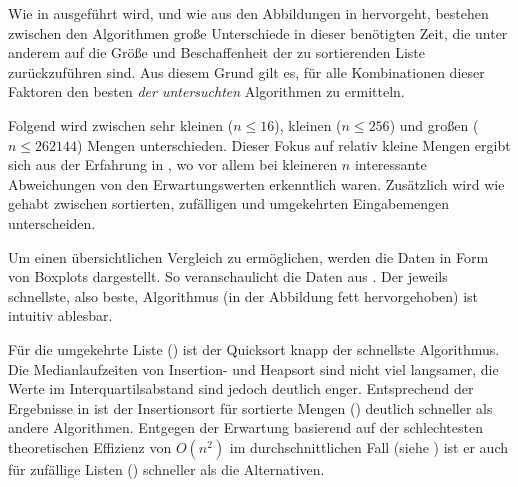 Wie in  ausgeführt wird, und wie aus den Abbildungen in  hervorgeht, bestehen zwischen den Algorithmen große Unterschiede in dieser benötigten Zeit, die unter anderem auf die Größe und Beschaffenheit der zu sortierenden Liste zurückzuführen sind. Aus diesem Grund gilt es, für alle Kombinationen dieser Faktoren den besten \emph{der untersuchten} Algorithmen zu ermitteln.


Folgend wird zwischen sehr kleinen ($n \leq 16$), kleinen ($n \leq 256$) und großen ($n \leq 262144$) Mengen unterschieden. Dieser Fokus auf relativ kleine Mengen ergibt sich aus der Erfahrung in , wo vor allem bei kleineren $n$ interessante Abweichungen von den Erwartungswerten erkenntlich waren. Zusätzlich wird wie gehabt zwischen sortierten, zufälligen und umgekehrten Eingabemengen unterscheiden.



Um einen übersichtlichen Vergleich zu ermöglichen, werden die Daten in Form von Boxplots dargestellt.  So veranschaulicht  die Daten aus . Der jeweils schnellste, also beste, Algorithmus (in der Abbildung fett hervorgehoben) ist intuitiv ablesbar.

Für die umgekehrte Liste () ist der Quicksort knapp der schnellste Algorithmus. Die Medianlaufzeiten von Insertion- und Heapsort sind nicht viel langsamer, die Werte im Interquartilsabstand sind jedoch deutlich enger. Entsprechend der Ergebnisse in  ist der Insertionsort für sortierte Mengen () deutlich schneller als andere Algorithmen. Entgegen der Erwartung basierend auf der schlechtesten theoretischen Effizienz von $O(n^2)$ im durchschnittlichen Fall (siehe ) ist er auch für zufällige Listen () schneller als die Alternativen.

